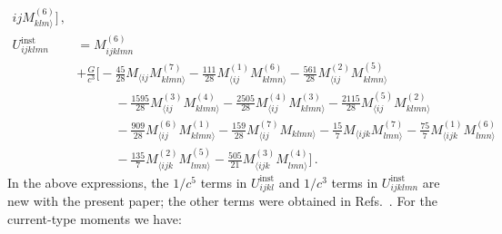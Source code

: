 \documentclass[prd,preprint,superscriptaddress,tightenlines,nofootinbib,
  eqsecnum,showpacs]{revtex4}
\begin{document}
\begin{subequations}
\begin{align}
{    ij}M^{(6)}_{klm\rangle}\bigg]\,,\label{U5}\\
U_{ijklmn}^\text{inst} &= M^{(6)}_{ijklmn} \nonumber \\ &+
\frac{G}{c^3} \bigg[ - \frac{45}{28} M_{\langle ij} M_{klmn
    \rangle}^{(7)} - \frac{111}{28} M_{\langle ij}^{(1)} M_{klmn
    \rangle}^{(6)} - \frac{561}{28} M_{\langle ij}^{(2)} M_{klmn
    \rangle}^{(5)} \nonumber \\ & \quad\qquad - \frac{1595}{28}
  M_{\langle ij}^{(3)} M_{klmn \rangle}^{(4)} - \frac{2505}{28}
  M_{\langle ij}^{(4)} M_{klmn \rangle}^{(3)} - \frac{2115}{28}
  M_{\langle ij}^{(5)} M_{klmn \rangle}^{(2)} \nonumber \\ &
  \quad\qquad - \frac{909}{28} M_{\langle ij}^{(6)} M_{klmn
    \rangle}^{(1)} - \frac{159}{28} M_{\langle ij}^{(7)} M_{klmn
    \rangle} - \frac{15}{7} M_{\langle ijk} M_{lmn \rangle}^{(7)} -
  \frac{75}{7} M_{\langle ijk}^{(1)} M_{lmn \rangle}^{(6)} \nonumber
  \\ & \quad\qquad - \frac{135}{7} M_{\langle ijk}^{(2)} M_{lmn
    \rangle}^{(5)} - \frac{505}{21} M_{\langle ijk}^{(3)} M_{lmn
    \rangle}^{(4)} \bigg] \,.
\end{align}
\end{subequations}
%
In the above expressions, the $1/c^5$ terms in $U_{ijkl}^\text{inst}$
and $1/c^3$ terms in $U_{ijklmn}^\text{inst}$ are new with the present
paper; the other terms were obtained in
Refs.~\cite{BFIS08,FMBI12}. For the current-type moments we have:
%
\end{document}
